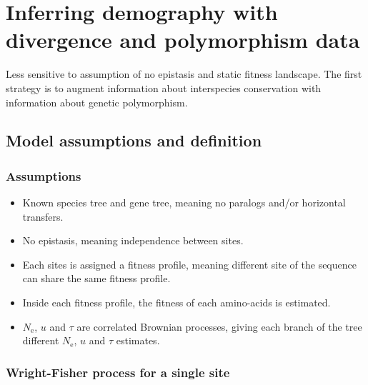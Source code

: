 \documentclass{article}
\newcommand{\e}{\mathrm{e}}
\newcommand{\Ne}{N_\e}
\begin{document}
\section{Inferring demography with divergence and polymorphism data}

Less sensitive to assumption of no epistasis and static fitness landscape.
The first strategy is to augment information about interspecies conservation with information about genetic polymorphism.

\subsection{Model assumptions and definition}

\subsubsection{Assumptions}

\begin{itemize}
	\setlength\itemsep{-0.25em}
	\item Known species tree and gene tree, meaning no paralogs and/or horizontal transfers.
	\item No epistasis, meaning independence between sites.
	\item Each sites is assigned a fitness profile, meaning different site of the sequence can share the same fitness profile.
	\item Inside each fitness profile, the fitness of each amino-acids is estimated.
	\item $\Ne$, $u$ and $\tau$ are correlated Brownian processes, giving each branch of the tree different $\Ne$, $u$ and $\tau$ estimates.
\end{itemize}

\subsubsection{Wright-Fisher process for a single site}
\end{document}
